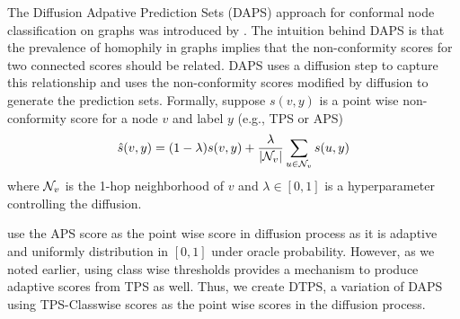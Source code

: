 The Diffusion Adpative Prediction Sets (DAPS) approach for conformal node classification on graphs was introduced by \citet{zargarbashi23conformal}.
The intuition behind DAPS is that the prevalence of homophily in graphs implies that the non-conformity scores for two connected scores should be related.
DAPS uses a diffusion step to capture this relationship and uses the non-conformity scores modified by diffusion to generate the prediction sets.
Formally, suppose $s(v, y)$ is a point wise non-conformity score for a node $v$ and label $y$ (e.g., TPS or APS)
\[
    \hat{s}(v, y) = (1 - \lambda) s(v, y) + \frac{\lambda}{|
    {\mathcal{N}}_v|} \sum\limits_{u \in {\mathcal{N}}_v} s(u, y)
\]
where ${\mathcal{N}}_v$ is the 1-hop neighborhood of $v$ and $\lambda \in [0, 1]$ is a hyperparameter controlling the diffusion.

\citet{zargarbashi23conformal} use the APS score as the point wise score in diffusion process as it is adaptive and uniformly distribution in $[0, 1]$ under oracle probability.
However, as we noted earlier, using class wise thresholds provides a mechanism to produce adaptive scores from TPS as well.
Thus, we create DTPS, a variation of DAPS using TPS-Classwise scores as the point wise scores in the diffusion process.